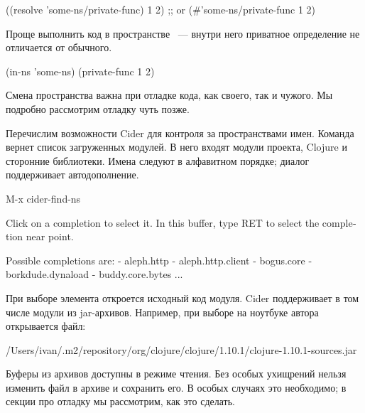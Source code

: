 \begin{english}
  \begin{clojure}
((resolve 'some-ns/private-func) 1 2)
;; or
(#'some-ns/private-func 1 2)
  \end{clojure}
\end{english}

Проще выполнить код в пространстве ~--- внутри него приватное определение не отличается от обычного.

\begin{english}
  \begin{clojure}
(in-ns 'some-ns)
(private-func 1 2)
  \end{clojure}
\end{english}

Смена пространства важна при отладке кода, как своего, так и чужого. Мы подробно рассмотрим отладку чуть позже.

Перечислим возможности Cider для контроля за пространствами имен. Команда  вернет список загруженных модулей. В него входят модули проекта, Clojure и сторонние библиотеки. Имена следуют в алфавитном порядке; диалог поддерживает автодополнение.

\begin{english}
  \begin{text}
M-x cider-find-ns

Click on a completion to select it.
In this buffer, type RET to select the completion near point.

Possible completions are:
- aleph.http
- aleph.http.client
- bogus.core
- borkdude.dynaload
- buddy.core.bytes
...
  \end{text}
\end{english}

При выборе элемента откроется исходный код модуля. Cider поддерживает в том числе модули из jar-архивов. Например, при выборе  на ноутбуке автора открывается файл:

\begin{english}
  \begin{text}
/Users/ivan/.m2/repository/org/clojure/clojure/1.10.1/clojure-1.10.1-sources.jar
  \end{text}
\end{english}

Буферы из архивов доступны в режиме чтения. Без особых ухищрений нельзя изменить файл в архиве и сохранить его. В особых случаях это необходимо; в секции про отладку мы рассмотрим, как это сделать.

